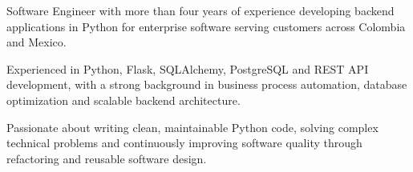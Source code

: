 
\begin{cvparagraph}
Software Engineer with more than four years of experience developing backend applications in Python for enterprise software serving customers across Colombia and Mexico.

Experienced in Python, Flask, SQLAlchemy, PostgreSQL and REST API development, with a strong background in business process automation, database optimization and scalable backend architecture.

Passionate about writing clean, maintainable Python code, solving complex technical problems and continuously improving software quality through refactoring and reusable software design.
\end{cvparagraph}